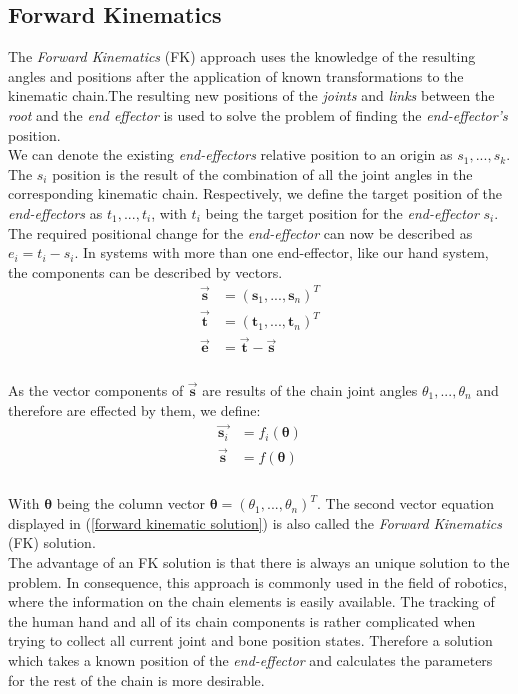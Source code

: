  \subsection{Forward Kinematics}
  \label{sec:Forward Kinematics} 
The \textit{Forward Kinematics} (FK) approach uses the knowledge of the resulting angles and positions after the application of known transformations to the kinematic chain.The resulting new positions of the \textit{joints} and \textit{links} between the \textit{root} and the \textit{end effector} is used to solve the problem of finding the \textit{end-effector's} position.\\
We can denote the existing \textit{end-effectors} relative position to an origin as $ s_{1},...,s_{k}$. The $s_{i}$ position is the result of the combination of all the joint angles in the corresponding kinematic chain. Respectively, we define the target position of the \textit{end-effectors} as $t_{1},...,t_{i}$, with $t_{i}$ being the target position for the \textit{end-effector} $s_{i}$. The required positional change for the \textit{end-effector} can now be described as $e_{i}=t_{i}-s_{i}$. In systems with more than one end-effector, like our hand system, the components can be described by vectors.\\
\begin{equation}
\label{fk components}
\begin{split}
\vec{\textbf{s}}&=(\textbf{s}_{1},...,\textbf{s}_{n})^{T}\\
\vec{\textbf{t}}&=(\textbf{t}_{1},...,\textbf{t}_{n})^{T}\\
\vec{\textbf{e}}&= \vec{\textbf{t}}-\vec{\textbf{s}}\\
\end{split}
\end{equation}
\\As the vector components of $\vec{\textbf{s}}$ are results of the chain joint angles $\theta_{1},...,\theta_{n}$ and therefore are effected by them, we define: \\
\begin{equation}
\label{forward kinematic solution}
\begin{split}
\vec{\textbf{s}_{i}}&=f_{i}(\pmb{\theta})\\
\vec{\textbf{s}}&=f(\pmb{\theta})\\
\end{split}
\end{equation}
\\With $\pmb{\theta}$ being the column vector $\pmb{\theta}=(\theta_{1},...,\theta_{n})^{T}$. The second vector equation displayed in (\ref{forward kinematic solution}) is also called the \textit{Forward Kinematics} (FK) solution.\\
The advantage of an FK solution is that there is always an unique solution to the problem. In consequence, this approach is commonly used in the field of robotics, where the information on the chain elements is easily available.
The tracking of the human hand and all of its chain components is rather complicated when trying to collect all current joint and bone position states. Therefore a solution which takes a known position of the \textit{end-effector} and calculates the parameters for the rest of the chain is more desirable.
